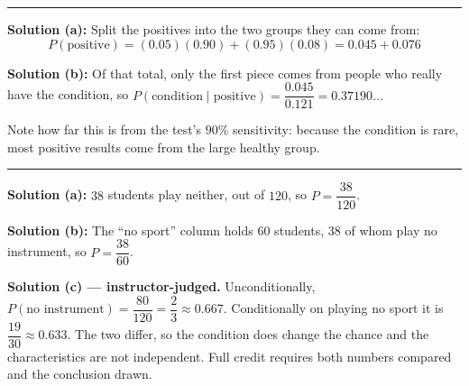 \documentclass[12pt]{article}
\begin{document}
\vspace{0.15cm}\noindent\rule{\linewidth}{0.2pt}\vspace{0.15cm}


\textbf{Solution (a):} \quad Split the positives into the two groups they can come from:
\[ P(\text{positive}) = (0.05)(0.90) + (0.95)(0.08) = 0.045 + 0.076 \]

\textbf{Solution (b):} \quad Of that total, only the first piece comes from people who really
have the condition, so
$P(\text{condition} \mid \text{positive}) = \dfrac{0.045}{0.121} = 0.37190\ldots$

Note how far this is from the test's $90\%$ sensitivity: because the condition is rare, most
positive results come from the large healthy group.

\vspace{0.15cm}\noindent\rule{\linewidth}{0.2pt}\vspace{0.15cm}


\textbf{Solution (a):} \quad $38$ students play neither, out of $120$, so
$P = \dfrac{38}{120}$. 

\textbf{Solution (b):} \quad The ``no sport'' column holds $60$ students, $38$ of whom play no
instrument, so $P = \dfrac{38}{60}$. 

\textbf{Solution (c) --- instructor-judged.} \quad Unconditionally,
$P(\text{no instrument}) = \dfrac{80}{120} = \dfrac{2}{3} \approx 0.667$. Conditionally on
playing no sport it is $\dfrac{19}{30} \approx 0.633$. The two differ, so the condition does
change the chance and the characteristics are not independent. Full credit requires both
numbers compared and the conclusion drawn.
\end{document}
